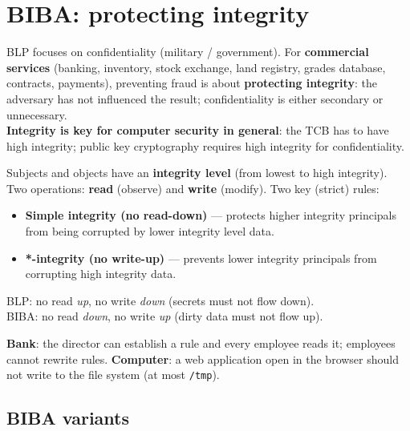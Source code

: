 \section{BIBA: protecting integrity}

\begin{rembox}[title=Why integrity?]
BLP focuses on confidentiality (military / government). For \textbf{commercial services}
(banking, inventory, stock exchange, land registry, grades database, contracts,
payments), preventing fraud is about \textbf{protecting integrity}: the adversary has not
influenced the result; confidentiality is either secondary or unnecessary. \\
\textbf{Integrity is key for computer security in general}: the TCB has to have high
integrity; public key cryptography requires high integrity for confidentiality.
\end{rembox}

\begin{defnbox}[title=BIBA model]
Subjects and objects have an \textbf{integrity level} (from lowest to high integrity).
Two operations: \textbf{read} (observe) and \textbf{write} (modify). Two key (strict)
rules:
\begin{itemize}
  \item \textbf{Simple integrity (no read-down)} --- protects higher integrity
        principals from being corrupted by lower integrity level data.
  \item \textbf{*-integrity (no write-up)} --- prevents lower integrity principals from
        corrupting high integrity data.
\end{itemize}
\end{defnbox}

\begin{rembox}[title=BIBA is the dual of BLP]
BLP: no read \emph{up}, no write \emph{down} (secrets must not flow down). \\
BIBA: no read \emph{down}, no write \emph{up} (dirty data must not flow up).
\end{rembox}

\begin{exbox}[title=BIBA illustrated]
\textbf{Bank}: the director can establish a rule and every employee reads it; employees
cannot rewrite rules. \textbf{Computer}: a web application open in the browser should not
write to the file system (at most \texttt{/tmp}).
\end{exbox}

\subsection{BIBA variants}

